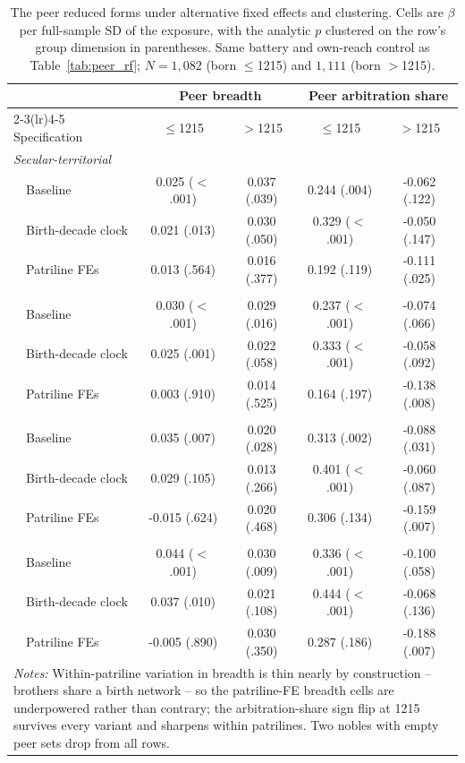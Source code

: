 \documentclass[12pt]{article}
\theoremstyle{definition}
\theoremstyle{remark}
\begin{document}
\begin{table}[t]
\centering
\caption{The peer reduced forms under alternative fixed effects and clustering. Cells are $\beta$ per full-sample SD of the exposure, with the analytic $p$ clustered on the row's group dimension in parentheses. Same battery and own-reach control as Table~\ref{tab:peer_rf}; $N = 1{,}082$ (born $\leq$1215) and $1{,}111$ (born $>$1215).}
\label{tab:app_fe_peer}
{\footnotesize\setlength{\tabcolsep}{4pt}
\begin{tabular}{lcccc}
\toprule
 & \multicolumn{2}{c}{Peer breadth} & \multicolumn{2}{c}{Peer arbitration share} \\
\cmidrule(lr){2-3}\cmidrule(lr){4-5}
Specification & $\leq$1215 & $>$1215 & $\leq$1215 & $>$1215 \\
\midrule
\multicolumn{5}{l}{\textit{Secular-territorial}} \\
~~Baseline & 0.025 ($<$.001) & 0.037 (.039) & 0.244 (.004) & -0.062 (.122) \\
~~Birth-decade clock & 0.021 (.013) & 0.030 (.050) & 0.329 ($<$.001) & -0.050 (.147) \\
~~Patriline FEs & 0.013 (.564) & 0.016 (.377) & 0.192 (.119) & -0.111 (.025) \\
\addlinespace
\multicolumn{5}{l}{\textit{Dispute}} \\
~~Baseline & 0.030 ($<$.001) & 0.029 (.016) & 0.237 ($<$.001) & -0.074 (.066) \\
~~Birth-decade clock & 0.025 (.001) & 0.022 (.058) & 0.333 ($<$.001) & -0.058 (.092) \\
~~Patriline FEs & 0.003 (.910) & 0.014 (.525) & 0.164 (.197) & -0.138 (.008) \\
\addlinespace
\multicolumn{5}{l}{\textit{Non-dispute}} \\
~~Baseline & 0.035 (.007) & 0.020 (.028) & 0.313 (.002) & -0.088 (.031) \\
~~Birth-decade clock & 0.029 (.105) & 0.013 (.266) & 0.401 ($<$.001) & -0.060 (.087) \\
~~Patriline FEs & -0.015 (.624) & 0.020 (.468) & 0.306 (.134) & -0.159 (.007) \\
\addlinespace
\multicolumn{5}{l}{\textit{All documents}} \\
~~Baseline & 0.044 ($<$.001) & 0.030 (.009) & 0.336 ($<$.001) & -0.100 (.058) \\
~~Birth-decade clock & 0.037 (.010) & 0.021 (.108) & 0.444 ($<$.001) & -0.068 (.136) \\
~~Patriline FEs & -0.005 (.890) & 0.030 (.350) & 0.287 (.186) & -0.188 (.007) \\
\midrule
\multicolumn{5}{p{0.9\textwidth}}{\footnotesize \textit{Notes:} Within-patriline variation in breadth is thin nearly by construction -- brothers share a birth network -- so the patriline-FE breadth cells are underpowered rather than contrary; the arbitration-share sign flip at 1215 survives every variant and sharpens within patrilines. Two nobles with empty peer sets drop from all rows.} \\
\bottomrule
\end{tabular}
}
\end{table}
\end{document}
